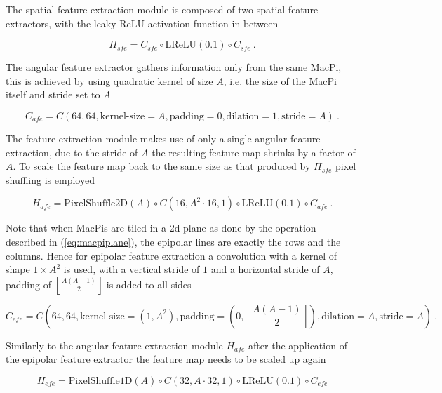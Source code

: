 The spatial feature extraction module is composed of two spatial feature extractors,
with the leaky ReLU activation function in between 

\begin{equation}
    H_{sfe} = C_{sfe} \circ \text{LReLU}(0.1) \circ C_{sfe} ~.
\end{equation}

The angular feature extractor gathers information only from the same MacPi,
this is achieved by using quadratic kernel of size $A$, i.e. the size of the MacPi itself
and stride set to $A$ 

\begin{equation}
    \label{eq:sfe}
    C_{afe} = C(64, 64, \text{kernel-size}=A, \text{padding}=0, \text{dilation}=1, \text{stride}=A) ~.
\end{equation}

The feature extraction module makes use of only a single angular feature extraction,
due to the stride of $A$ the resulting feature map shrinks by a factor of $A$.
To scale the feature map back to the same size as that produced by $H_{sfe}$ pixel shuffling is employed

\begin{equation}
    H_{afe} = \text{PixelShuffle2D}(A) \circ C(16, A^2\cdot 16, 1) \circ \text{LReLU}(0.1) \circ C_{afe} ~.
\end{equation}

Note that when MacPis are tiled in a $2$d plane as done by the operation described in (\ref{eq:macpiplane}),
the epipolar lines are exactly the rows and the columns.
Hence for epipolar feature extraction a convolution with a kernel of shape $1 \times A^2$ is used,
with a vertical stride of $1$ and a horizontal stride of $A$, padding of $\left \lfloor \frac{A(A-1)}{2} \right \rfloor$
is added to all sides

\begin{equation}
    \label{eq:sfe}
    C_{efe} = C(64, 64, \text{kernel-size}=(1, A^2), \text{padding}=(0, \left \lfloor \frac{A(A-1)}{2} \right \rfloor), \text{dilation}=A, \text{stride}=A) ~.
\end{equation}

Similarly to the angular feature extraction module $H_{afe}$ after the application of the epipolar feature extractor
the feature map needs to be scaled up again

\begin{equation}
    H_{efe} = \text{PixelShuffle1D}(A) \circ C(32, A  \cdot 32, 1) \circ \text{LReLU}(0.1) \circ C_{efe}
\end{equation}


